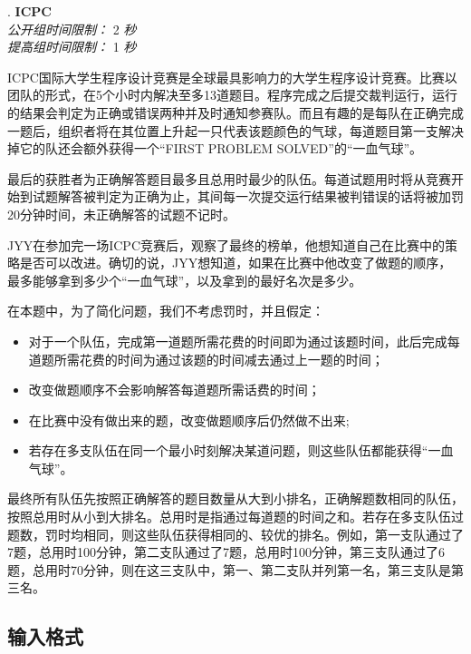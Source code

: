 \addtocounter{ProblemNo}{1}
\renewcommand{\ProblemName}{ICPC}
\begin{center}
\huge{. \textbf{\ProblemName}} \\ [0.8cm]
\large{\textit{公开组时间限制：} 2 \textit{秒}} \\ 
\large{\textit{提高组时间限制：} 1 \textit{秒}} \\ [1cm]
\end{center}

ICPC国际大学生程序设计竞赛是全球最具影响力的大学生程序设计竞赛。比赛以团队的形式，在5个小时内解决至多13道题目。程序完成之后提交裁判运行，运行的结果会判定为正确或错误两种并及时通知参赛队。而且有趣的是每队在正确完成一题后，组织者将在其位置上升起一只代表该题颜色的气球，每道题目第一支解决掉它的队还会额外获得一个“FIRST PROBLEM SOLVED”的“一血气球”。

最后的获胜者为正确解答题目最多且总用时最少的队伍。每道试题用时将从竞赛开始到试题解答被判定为正确为止，其间每一次提交运行结果被判错误的话将被加罚20分钟时间，未正确解答的试题不记时。

JYY在参加完一场ICPC竞赛后，观察了最终的榜单，他想知道自己在比赛中的策略是否可以改进。确切的说，JYY想知道，如果在比赛中他改变了做题的顺序，最多能够拿到多少个“一血气球”，以及拿到的最好名次是多少。

在本题中，为了简化问题，我们不考虑罚时，并且假定：
\begin{itemize}
\item 对于一个队伍，完成第一道题所需花费的时间即为通过该题时间，此后完成每道题所需花费的时间为通过该题的时间减去通过上一题的时间；
\item 改变做题顺序不会影响解答每道题所需话费的时间；
\item 在比赛中没有做出来的题，改变做题顺序后仍然做不出来;
\item 若存在多支队伍在同一个最小时刻解决某道问题，则这些队伍都能获得“一血气球”。
\end{itemize}

最终所有队伍先按照正确解答的题目数量从大到小排名，正确解题数相同的队伍，按照总用时从小到大排名。总用时是指通过每道题的时间之和。若存在多支队伍过题数，罚时均相同，则这些队伍获得相同的、较优的排名。例如，第一支队通过了7题，总用时100分钟，第二支队通过了7题，总用时100分钟，第三支队通过了6题，总用时70分钟，则在这三支队中，第一、第二支队并列第一名，第三支队是第三名。

\subsection*{输入格式}

